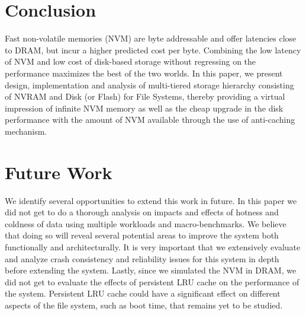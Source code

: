 \section{Conclusion}
\label{sec-conc}

Fast non-volatile memories (NVM) are byte addressable and offer latencies close to DRAM, but incur a higher predicted cost per byte. Combining the low latency of NVM and low cost of disk-based storage without regressing on the performance maximizes the best of the two worlds. In this paper, we present design, implementation and analysis of multi-tiered storage hierarchy consisting of NVRAM and Disk (or Flash) for File Systems, thereby providing a virtual impression of infinite NVM memory as well as the cheap upgrade in the disk performance with the amount of NVM available through the use of anti-caching mechanism.


\section{Future Work}
\label{sec-conc}

We identify several opportunities to extend this work in future. In this paper we did not get to do a thorough analysis on impacts and effects of hotness and coldness of data using multiple workloads and macro-benchmarks. We believe that doing so will reveal several potential areas to improve the system both functionally and architecturally. It is very important that we extensively evaluate and analyze crash consistency and reliability issues for this system in depth before extending the system. Lastly, since we simulated the NVM in DRAM, we did not get to evaluate the effects of persistent LRU cache on the performance of the system. Persistent LRU cache could have a significant effect on different aspects of the file system, such as boot time, that remains yet to be studied.
